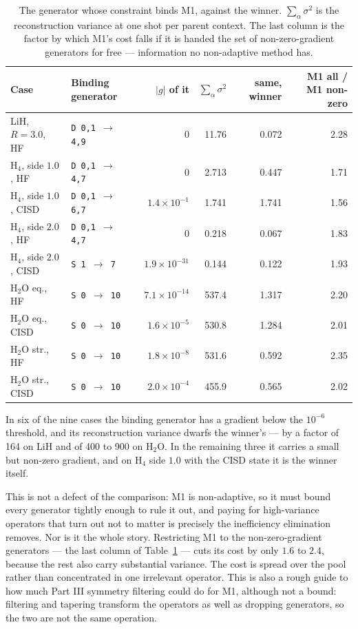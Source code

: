 \documentclass[10pt]{article}
\begin{document}
\begin{table}[!htbp]
\centering
\scriptsize
\caption{The generator whose constraint binds M1, against the winner. $\sum_\alpha\sigma^2$ is the reconstruction variance at one shot per parent context. The last column is the factor by which M1's cost falls if it is handed the set of non-zero-gradient generators for free --- information no non-adaptive method has.}
\label{tab:binding}
\begin{tabular}{llrrrr}
\toprule
Case & Binding generator & $|g|$ of it & $\sum_\alpha\sigma^2$ & same, winner & M1 all / M1 non-zero \\
\midrule
LiH, $R{=}3.0$, HF        & \texttt{D 0,1 $\to$ 4,9} & $0$                 & 11.76  & 0.072 & 2.28 \\
H$_4$, side $1.0$, HF     & \texttt{D 0,1 $\to$ 4,7} & $0$                 & 2.713  & 0.447 & 1.71 \\
H$_4$, side $1.0$, CISD   & \texttt{D 0,1 $\to$ 6,7} & $1.4\times10^{-1}$  & 1.741  & 1.741 & 1.56 \\
H$_4$, side $2.0$, HF     & \texttt{D 0,1 $\to$ 4,7} & $0$                 & 0.218  & 0.067 & 1.83 \\
H$_4$, side $2.0$, CISD   & \texttt{S 1 $\to$ 7}     & $1.9\times10^{-31}$ & 0.144  & 0.122 & 1.93 \\
H$_2$O eq., HF            & \texttt{S 0 $\to$ 10}    & $7.1\times10^{-14}$ & 537.4  & 1.317 & 2.20 \\
H$_2$O eq., CISD          & \texttt{S 0 $\to$ 10}    & $1.6\times10^{-5}$  & 530.8  & 1.284 & 2.01 \\
H$_2$O str., HF           & \texttt{S 0 $\to$ 10}    & $1.8\times10^{-8}$  & 531.6  & 0.592 & 2.35 \\
H$_2$O str., CISD         & \texttt{S 0 $\to$ 10}    & $2.0\times10^{-4}$  & 455.9  & 0.565 & 2.02 \\
\bottomrule
\end{tabular}
\end{table}

In six of the nine cases the binding generator has a gradient below the $10^{-6}$ threshold, and its reconstruction variance dwarfs the winner's --- by a factor of 164 on LiH and of 400 to 900 on H$_2$O. In the remaining three it carries a small but non-zero gradient, and on H$_4$ side $1.0$ with the CISD state it is the winner itself.

This is not a defect of the comparison: M1 is non-adaptive, so it must bound every generator tightly enough to rule it out, and paying for high-variance operators that turn out not to matter is precisely the inefficiency elimination removes. Nor is it the whole story. Restricting M1 to the non-zero-gradient generators --- the last column of Table~\ref{tab:binding} --- cuts its cost by only $1.6$ to $2.4$, because the rest also carry substantial variance. The cost is spread over the pool rather than concentrated in one irrelevant operator. This is also a rough guide to how much Part III symmetry filtering could do for M1, although not a bound: filtering and tapering transform the operators as well as dropping generators, so the two are not the same operation.
\end{document}
